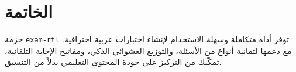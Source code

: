 \documentclass[a4paper]{article}
\begin{document}
\section{الخاتمة}

حزمة \texttt{exam-rtl} توفر أداة متكاملة وسهلة الاستخدام لإنشاء اختبارات عربية احترافية. مع دعمها لثمانية أنواع من الأسئلة، والتوزيع العشوائي الذكي، ومفاتيح الإجابة التلقائية، تمكّنك من التركيز على جودة المحتوى التعليمي بدلاً من التنسيق.
\end{document}
